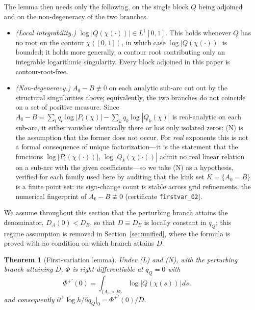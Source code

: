 \documentclass[11pt,reqno]{amsart}
\theoremstyle{plain}
\newtheorem{theorem}{Theorem}
\theoremstyle{definition}
\theoremstyle{remark}
\newcommand{\dplus}{\partial^{+}}
\newcommand{\dA}{D_A}
\newcommand{\dB}{D_B}
\begin{document}
The lemma then needs only the following, on the single block $Q$ being adjoined and on
the non-degeneracy of the two branches.
\begin{itemize}
\item[(L)] \emph{(Local integrability.)} $\log|Q(\chi(\cdot))|\in L^1[0,1]$. This holds
  whenever $Q$ has no root on the contour $\chi([0,1])$, in which case
  $\log|Q(\chi(\cdot))|$ is bounded; it holds more generally, a contour root
  contributing only an integrable logarithmic singularity. Every block adjoined in this
  paper is contour-root-free.
\item[(N)] \emph{(Non-degeneracy.)} $A_0-B\not\equiv0$ on each analytic sub-arc cut out
  by the structural singularities above; equivalently, the two branches do not coincide
  on a set of positive measure. Since $A_0-B=\sum_i q_i\log|P_i(\chi)|-\sum_k
  q_k\log|Q_k(\chi)|$ is real-analytic on each sub-arc, it either vanishes identically
  there or has only isolated zeros; (N) is the assumption that the former does not
  occur. For \emph{real} exponents this is not a formal consequence of unique
  factorization---it is the statement that the functions $\log|P_i(\chi(\cdot))|$,
  $\log|Q_k(\chi(\cdot))|$ admit no real linear relation on a sub-arc with the given
  coefficients---so we take (N) as a hypothesis, verified for each family used here by
  auditing that the kink set $K=\{A_0=B\}$ is a finite point set: its sign-change count
  is stable across grid refinements, the numerical fingerprint of $A_0-B\not\equiv0$
  (certificate \texttt{firstvar\_02}).
\end{itemize}
We assume throughout this section that the perturbing branch attains the denominator,
$\dA(0)<\dB$, so that $D\equiv\dB$ is locally constant in $q_Q$; this regime
assumption is removed in Section~\ref{sec:unified}, where the formula is proved with no
condition on which branch attains $D$.

\begin{theorem}[First-variation lemma]\label{thm:firstvar}
Under \emph{(L)} and \emph{(N)}, with the perturbing branch attaining $D$, $\Phi$ is
right-differentiable at $q_Q=0$ with
\begin{equation}\label{eq:Phiprime}
  \Phi^{+\prime}(0)=\int_{\{A_0>B\}}\log|Q(\chi(s))|\,ds,
\end{equation}
and consequently $\dplus\!\log h/\partial q_Q|_0=\Phi^{+\prime}(0)/D$.
\end{theorem}
\end{document}
